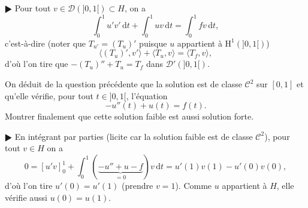 \documentclass[11pt,a4paper]{article}
\def\CC{\mathscr{C}}
\def\DD{\mathscr{D}}
\def\H{\mathrm{H}}
\def\d{\mathrm{d}}
\def\la{\langle}
\def\ra{\rangle}
\theoremstyle{plain}
\theoremstyle{definition}
\begin{document}
\begin{Exercice}[6 points]
\begin{corr} $\RHD$ Pour tout $v \in \DD(]0,1[) \subset H$, on a
\[ \int_0^1 u'v'\,\d t + \int_0^1 uv\,\d t = \int_0^1 fv\,\d t, \]
c'est-\`a-dire (noter que $T_{u'}=(T_u)'$ puisque $u$ appartient \`a $\H^1(]0,1[)$)
\[ \la (T_u)',v' \ra + \la T_u,v \ra = \la T_f,v \ra, \]
d'o\`u l'on tire que $-(T_u)''+T_u=T_f$ dans $\DD'(]0,1[)$.
\end{corr}

\begin{Question} On d\'eduit de la question pr\'ec\'edente que la solution est de
classe $\CC^2$ sur $[0,1]$ et qu'elle v\'erifie, pour tout $t \in ]0,1[$,
l'\'equation
\[ -u''(t)+u(t) = f(t). \]
Montrer finalement que cette solution faible est aussi solution forte. 
\end{Question}

\begin{corr} $\RHD$ En int\'egrant par parties (licite car la solution faible est de
classe $\CC^2$), pour tout $v \in H$ on a
\[ 0 = [u'v]_0^1+\int_0^1(\underbrace{-u''+u-f}_{=0})v\,\d t = u'(1)v(1)-u'(0)v(0), \]
d'o\`u l'on tire $u'(0)=u'(1)$ (prendre $v=1$).
Comme $u$ appartient \`a $H$, elle v\'erifie aussi $u(0)=u(1)$.
\end{corr}

\end{Exercice} \vspace*{1em}
\end{document}
